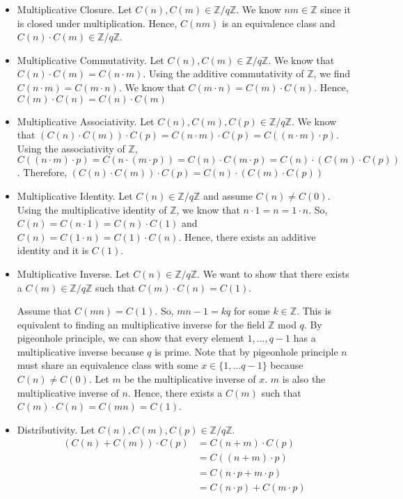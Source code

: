 \documentclass[12pt]{article}
\begin{document}
\begin{enumerate}[start=1,label={\bfseries Problem \arabic*:},leftmargin=1in]
\begin{enumerate}
\begin{itemize}
            \item Multiplicative Closure. Let $C(n), C(m) \in \mathbb{Z}/q\mathbb{Z}$. We know $nm \in \mathbb{Z}$ since it is closed under multiplication. 
            Hence, $C(nm)$ is an equivalence class and $C(n) \cdot C(m) \in \mathbb{Z}/q\mathbb{Z}$.
            \item Multiplicative Commutativity. Let $C(n), C(m) \in \mathbb{Z}/q\mathbb{Z}$.
            We know that $C(n) \cdot C(m) = C(n \cdot m)$. Using the additive commutativity of $\mathbb{Z}$, we find 
            $C(n \cdot m) = C(m \cdot n)$. We know that $C(m\cdot n) = C(m) \cdot C(n)$. Hence, $C(m)\cdot C(n) = C(n)\cdot C(m)$
            \item Multiplicative Associativity. Let $C(n), C(m), C(p) \in \mathbb{Z}/q\mathbb{Z}$. 
            We know that $(C(n) \cdot C(m)) \cdot C(p) = C(n \cdot m) \cdot C(p) = C((n \cdot m) \cdot p)$. Using the associativity of $\mathbb{Z}$, 
            $C((n\cdot m) \cdot p) = C(n \cdot (m \cdot p)) = C(n) \cdot C(m \cdot p) = C(n) \cdot (C(m) \cdot C(p))$. Therefore, $(C(n) \cdot C(m)) \cdot C(p) = C(n) \cdot (C(m)\cdot C(p))$ 
            \item Multiplicative Identity. Let $C(n) \in \mathbb{Z}/q\mathbb{Z}$ and assume $C(n) \neq C(0)$. Using the multiplicative identity of $\mathbb{Z}$, 
            we know that $n \cdot 1 = n = 1 \cdot n$. So, $C(n) = C(n \cdot 1) = C(n) \cdot C(1)$ and $C(n) = C(1 \cdot n) = C(1) \cdot C(n)$. Hence, there exists an additive identity and it is $C(1)$. 
            \item Multiplicative Inverse. Let $C(n) \in \mathbb{Z}/q\mathbb{Z}$. We want to show that there exists a $C(m) \in \mathbb{Z}/q\mathbb{Z}$ such that $C(m) \cdot C(n) = C(1)$. 
            
            Assume that $C(mn) = C(1)$. So, $mn - 1 = kq$ for some $k \in \mathbb{Z}$. This is equivalent to finding an multiplicative inverse for the field $\mathbb{Z}$ mod $q$. 
            By pigeonhole principle, we can show that every element $1, ..., q-1$ has a multiplicative inverse because $q$ is prime. 
            Note that by pigeonhole principle $n$ must share an equivalence class with some $x \in \{ 1, ... q-1 \}$ because $C(n) \neq C(0)$. Let $m$ be the multiplicative inverse of $x$. 
            $m$ is also the multiplicative inverse of $n$. Hence, there exists a $C(m)$ such that $C(m) \cdot C(n) = C(mn) = C(1)$. 
            \item Distributivity. Let $C(n), C(m), C(p) \in \mathbb{Z}/q\mathbb{Z}$. 
            \begin{align*}
                (C(n) + C(m)) \cdot C(p) &= C(n + m) \cdot C(p) \\ 
                &= C((n+m) \cdot p) \\ 
                &= C(n \cdot p + m \cdot p) \\ 
                &= C(n \cdot p) + C(m \cdot p)
            \end{align*}


\end{itemize}
\end{enumerate}
\end{enumerate}
\end{document}
